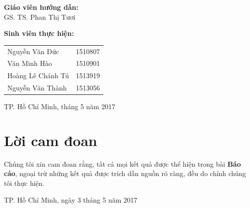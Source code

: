 \documentclass[12pt]{report}
\begin{document}
\begin{titlepage}
\begin{flushright}
\begin{minipage}{0.7\textwidth}

\end{minipage}
\end{flushright}

\begin{flushleft} \large
\textbf{Giáo viên hướng dẫn:}\\
GS. TS. Phan Thị Tươi\\
\end{flushleft}

\begin{flushleft} \large
\textbf{Sinh viên thực hiện:}\\
\begin{tabular}{ll}
Nguyễn Văn Đức & \hspace{0.5cm} 1510807\\
Văn Minh Hào & \hspace{0.5cm} 1510901 \\
Hoàng Lê Chánh Tú & \hspace{0.5cm} 1513919\\
Nguyễn Văn Thành & \hspace{0.5cm} 1513056\\[1.5cm]
\end{tabular}
\end{flushleft}

\begin{flushleft} \large
\centering
TP. Hồ Chí Minh, tháng 5 năm 2017
\end{flushleft}

\vfill %

\end{titlepage}
\newpage
	\chapter*{Lời cam đoan}
		\par Chúng tôi xin cam đoan rằng, tất cả mọi kết quả được thể hiện trong bài \textbf{Báo cáo}, ngoại trừ những kết quả được trích dẫn nguồn rõ ràng, đều do chính chúng tôi thực hiện.

		\begin{flushright}
			TP. Hồ Chí Minh, ngày 3 tháng 5 năm 2017
		\end{flushright}
\end{document}
